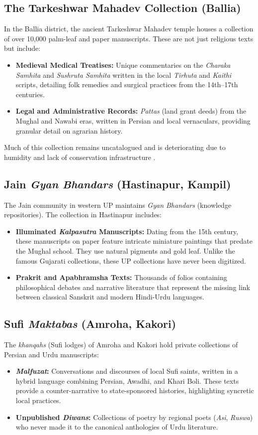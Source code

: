 \documentclass{article}
\begin{document}
\subsection{The Tarkeshwar Mahadev Collection (Ballia)}
In the Ballia district, the ancient Tarkeshwar Mahadev temple houses a collection of over 10,000 palm-leaf and paper manuscripts. These are not just religious texts but include:
\begin{itemize}
    \item \textbf{Medieval Medical Treatises:} Unique commentaries on the \textit{Charaka Samhita} and \textit{Sushruta Samhita} written in the local \textit{Tirhuta} and \textit{Kaithi} scripts, detailing folk remedies and surgical practices from the 14th–17th centuries.
    \item \textbf{Legal and Administrative Records:} \textit{Pattas} (land grant deeds) from the Mughal and Nawabi eras, written in Persian and local vernaculars, providing granular detail on agrarian history.
\end{itemize}
Much of this collection remains uncatalogued and is deteriorating due to humidity and lack of conservation infrastructure \cite{gnim2016manuscript}.

\subsection{Jain \textit{Gyan Bhandars} (Hastinapur, Kampil)}
The Jain community in western UP maintains \textit{Gyan Bhandars} (knowledge repositories). The collection in Hastinapur includes:
\begin{itemize}
    \item \textbf{Illuminated \textit{Kalpasutra} Manuscripts:} Dating from the 15th century, these manuscripts on paper feature intricate miniature paintings that predate the Mughal school. They use natural pigments and gold leaf. Unlike the famous Gujarati collections, these UP collections have never been digitized.
    \item \textbf{Prakrit and Apabhramsha Texts:} Thousands of folios containing philosophical debates and narrative literature that represent the missing link between classical Sanskrit and modern Hindi-Urdu languages.
\end{itemize}

\subsection{Sufi \textit{Maktabas} (Amroha, Kakori)}
The \textit{khanqahs} (Sufi lodges) of Amroha and Kakori hold private collections of Persian and Urdu manuscripts:
\begin{itemize}
    \item \textbf{\textit{Malfuzat}:} Conversations and discourses of local Sufi saints, written in a hybrid language combining Persian, Awadhi, and Khari Boli. These texts provide a counter-narrative to state-sponsored histories, highlighting syncretic local practices.
    \item \textbf{Unpublished \textit{Diwans}:} Collections of poetry by regional poets (\textit{Asi}, \textit{Ruswa}) who never made it to the canonical anthologies of Urdu literature.
\end{itemize}
\end{document}
